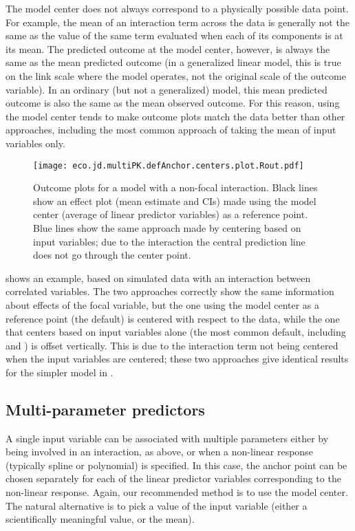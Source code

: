 The model center does not always correspond to a physically possible data point. For example, the mean of an interaction term across the data is generally not the same as the value of the same term evaluated when each of its components is at its mean. The predicted outcome at the model center, however, is always the same as the mean predicted outcome (in a generalized linear model, this is true on the link scale where the model operates, not the original scale of the outcome variable). In an ordinary (but not a generalized) model, this mean predicted outcome is also the same as the mean observed outcome. For this reason, using the model center tends to make outcome plots match the data better than other approaches, including the most common approach of taking the mean of input variables only.

\begin{figure}
\begin{center}
\texttt{[image: eco.jd.multiPK.defAnchor.centers.plot.Rout.pdf]}
\end{center}
\caption{Outcome plots for a model with a non-focal interaction. Black lines show an effect plot (mean estimate and CIs) made using the model center (average of linear predictor variables) as a reference point. Blue lines show the same approach made by centering based on input variables; due to the interaction the central prediction line does not go through the center point.}
\end{figure}

 shows an example, based on simulated data with an interaction between correlated variables. The two approaches correctly show the same information about effects of the focal variable, but the one using the model center as a reference point (the  default) is centered with respect to the data, while the one that centers based on input variables alone (the most common default, including  and ) is offset vertically. This is due to the interaction term not being centered when the input variables are centered; these two approaches give identical results for the simpler model in .

\subsection{Multi-parameter predictors}

A single input variable can be associated with multiple parameters either by being involved in an interaction, as above, or when a non-linear response (typically spline or polynomial) is specified. In this case, the anchor point can be chosen separately for each of the linear predictor variables corresponding to the non-linear response. Again, our recommended method is to use the model center. The natural alternative is to pick a value of the input variable (either a scientifically meaningful value, or the mean).

